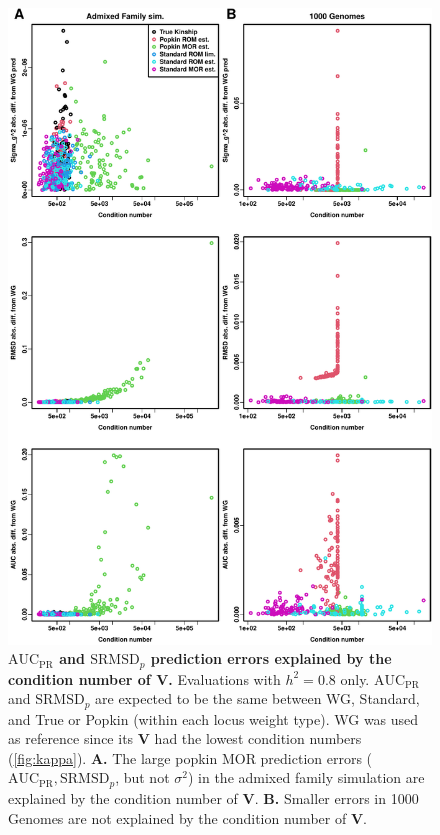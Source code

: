 \documentclass[11pt]{article}
\newcommand{\rmsd}{\text{SRMSD}_p}
\newcommand{\auc}{\text{AUC}_\text{PR}}
\begin{document}
\begin{figure}[bp!]
  \centering
  \includegraphics[height=0.85\textheight]{kappa-vs-pred-err.pdf}
  \caption{
    {\bf $\auc$ and $\rmsd$ prediction errors explained by the condition number of $\mathbf{V}$.}
    Evaluations with $h^2=0.8$ only.
    $\auc$ and $\rmsd$ are expected to be the same between WG, Standard, and True or Popkin (within each locus weight type).
    WG was used as reference since its $\mathbf{V}$ had the lowest condition numbers (\cref{fig:kappa}).
    \textbf{A.}
    The large popkin MOR prediction errors ($\auc,\rmsd$, but not $\sigma^2$) in the admixed family simulation are explained by the condition number of $\mathbf{V}$.
    \textbf{B.}
    Smaller errors in 1000 Genomes are not explained by the condition number of $\mathbf{V}$.
  }
  \label{fig:kappa-vs-pred-err}
\end{figure}
\end{document}
